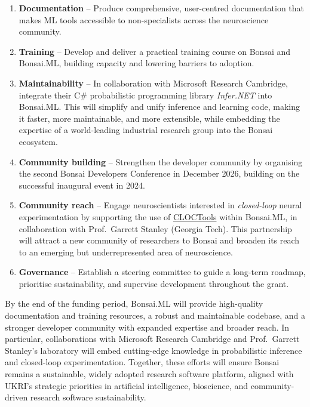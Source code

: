 \begin{enumerate}

  \item \textbf{Documentation} – Produce comprehensive, user-centred
documentation that makes ML tools accessible to non-specialists across the
neuroscience community.  

  \item \textbf{Training} – Develop and deliver a practical training course on
Bonsai and Bonsai.ML, building capacity and lowering barriers to adoption.  

  \item \textbf{Maintainability} – In collaboration with Microsoft
Research Cambridge, integrate their C\# probabilistic programming library
\emph{Infer.NET} into Bonsai.ML. This will simplify and unify inference and
learning code, making it faster, more maintainable, and more extensible, while
embedding the expertise of a world-leading industrial research group into the
Bonsai ecosystem.  

  \item \textbf{Community building} – Strengthen the developer community by
organising the second Bonsai Developers Conference in December 2026, building
on the successful inaugural event in 2024.  

  \item \textbf{Community reach} – Engage neuroscientists interested in
\emph{closed-loop} neural experimentation by supporting the use of
\href{https://cloctools.github.io/}{CLOCTools} within Bonsai.ML, in
collaboration with Prof.~Garrett Stanley (Georgia Tech). This partnership will
attract a new community of researchers to Bonsai and broaden its reach to an
emerging but underrepresented area of neuroscience.

  \item \textbf{Governance} – Establish a steering committee to guide a
long-term roadmap, prioritise sustainability, and supervise development
throughout the grant.

\end{enumerate}

By the end of the funding period, Bonsai.ML will provide high-quality
documentation and training resources, a robust and maintainable codebase, and a
stronger developer community with expanded expertise and broader reach. In
particular, collaborations with Microsoft Research Cambridge and
Prof.~Garrett Stanley’s laboratory will embed cutting-edge knowledge in
probabilistic inference and closed-loop experimentation. Together, these
efforts will ensure Bonsai remains a sustainable, widely adopted research
software platform, aligned with UKRI’s strategic priorities in artificial
intelligence, bioscience, and community-driven research software
sustainability.

